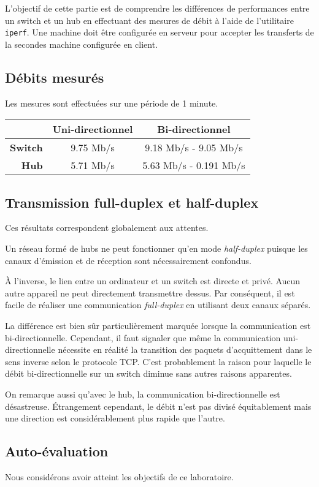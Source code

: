 \documentclass[11pt,a4paper]{article}
\begin{document}
L'objectif de cette partie est de comprendre les différences de performances entre un switch et un hub en effectuant des mesures de débit à l'aide de l'utilitaire \texttt{iperf}. Une machine doit être configurée en serveur pour accepter les transferts de la secondes machine configurée en client.

\subsection{Débits mesurés}

Les mesures sont effectuées sur une période de 1 minute.

\begin{tabular}{|r|c|c|}
	\hline
	& \textbf{Uni-directionnel} & \textbf{Bi-directionnel} \\
	\hline
	\textbf{Switch} & 9.75 Mb/s & 9.18 Mb/s - 9.05 Mb/s \\
	\textbf{Hub} & 5.71 Mb/s & 5.63 Mb/s - 0.191  Mb/s \\
	\hline
\end{tabular}

\subsection{Transmission full-duplex et half-duplex}

Ces résultats correspondent globalement aux attentes.

Un réseau formé de hubs ne peut fonctionner qu'en mode \textit{half-duplex} puisque les canaux d'émission et de réception sont nécessairement confondus.

À l'inverse, le lien entre un ordinateur et un switch est directe et privé. Aucun autre appareil ne peut directement transmettre dessus. Par conséquent, il est facile de réaliser une communication \textit{full-duplex} en utilisant deux canaux séparés.

La différence est bien sûr particulièrement marquée lorsque la communication est bi-directionnelle. Cependant, il faut signaler que même la communication uni-directionnelle nécessite en réalité la transition des paquets d'acquittement dans le sens inverse selon le protocole TCP. C'est probablement la raison pour laquelle le débit bi-directionnelle sur un switch diminue sans autres raisons apparentes.

On remarque aussi qu'avec le hub, la communication bi-directionnelle est désastreuse. Étrangement cependant, le débit n'est pas divisé équitablement mais une direction est considérablement plus rapide que l'autre.

\subsection{Auto-évaluation}

Nous considérons avoir atteint les objectifs de ce laboratoire.
\end{document}
